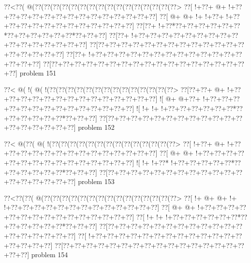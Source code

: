 \vbox{\vbox{\goo
\0??<\0??(\- @(\0??(\0??(\0??(\0??(\0??(\0??(\0??(\0??(\0??(\0??(\0??(\0??(\0??(\0??(\0??(\0??>
\0??[\- !+\0??+\- @+\- !+\0??+\0??+\0??+\0??+\0??+\0??+\0??+\0??+\0??+\0??+\0??+\0??+\0??+\0??]
\0??[\- @+\- @+\- !+\- !+\0??+\- !+\0??+\0??+\0??+\0??+\0??+\0??+\0??+\0??+\0??+\0??+\0??+\0??]
\0??[\0??+\- !+\0??*\0??+\0??+\0??+\0??+\0??+\0??*\0??+\0??+\0??+\0??+\0??+\0??*\0??+\0??+\0??]
\0??[\0??+\- !+\0??+\0??+\0??+\0??+\0??+\0??+\0??+\0??+\0??+\0??+\0??+\0??+\0??+\0??+\0??+\0??]
\0??[\0??+\0??+\0??+\0??+\0??+\0??+\0??+\0??+\0??+\0??+\0??+\0??+\0??+\0??+\0??+\0??+\0??+\0??]
\0??[\0??+\- !+\0??+\0??+\0??+\0??+\0??+\0??+\0??+\0??+\0??+\0??+\0??+\0??+\0??+\0??+\0??+\0??]
\0??[\0??+\0??+\0??+\0??+\0??+\0??+\0??+\0??+\0??+\0??+\0??+\0??+\0??+\0??+\0??+\0??+\0??+\0??]
}
\hfil problem 151\hfil\break
}



\vbox{\vbox{\goo
\0??<\- @(\- !(\- @(\- !(\0??(\0??(\0??(\0??(\0??(\0??(\0??(\0??(\0??(\0??(\0??(\0??(\0??(\0??>
\0??[\0??+\0??+\- @+\- !+\0??+\0??+\0??+\0??+\0??+\0??+\0??+\0??+\0??+\0??+\0??+\0??+\0??+\0??]
\- ![\- @+\- @+\0??+\- !+\0??+\0??+\0??+\0??+\0??+\0??+\0??+\0??+\0??+\0??+\0??+\0??+\0??+\0??]
\- ![\- !+\- !+\- !+\0??+\0??+\0??+\0??+\0??+\0??*\0??+\0??+\0??+\0??+\0??+\0??*\0??+\0??+\0??]
\0??[\0??+\0??+\0??+\0??+\0??+\0??+\0??+\0??+\0??+\0??+\0??+\0??+\0??+\0??+\0??+\0??+\0??+\0??]
}
\hfil problem 152\hfil\break
}



\vbox{\vbox{\goo
\0??<\- @(\0??(\- @(\- !(\0??(\0??(\0??(\0??(\0??(\0??(\0??(\0??(\0??(\0??(\0??(\0??(\0??(\0??>
\0??[\- !+\0??+\- @+\- !+\0??+\0??+\0??+\0??+\0??+\0??+\0??+\0??+\0??+\0??+\0??+\0??+\0??+\0??]
\0??[\- @+\- @+\- !+\0??+\0??+\0??+\0??+\0??+\0??+\0??+\0??+\0??+\0??+\0??+\0??+\0??+\0??+\0??]
\- ![\- !+\- !+\0??*\- !+\0??+\0??+\0??+\0??+\0??*\0??+\0??+\0??+\0??+\0??+\0??*\0??+\0??+\0??]
\0??[\0??+\0??+\0??+\0??+\0??+\0??+\0??+\0??+\0??+\0??+\0??+\0??+\0??+\0??+\0??+\0??+\0??+\0??]
}
\hfil problem 153\hfil\break
}



\vbox{\vbox{\goo
\0??<\0??(\0??(\- @(\0??(\0??(\0??(\0??(\0??(\0??(\0??(\0??(\0??(\0??(\0??(\0??(\0??(\0??(\0??>
\0??[\- !+\- @+\- @+\- !+\- !+\0??+\0??+\0??+\0??+\0??+\0??+\0??+\0??+\0??+\0??+\0??+\0??+\0??]
\0??[\- @+\- @+\- !+\0??+\0??+\0??+\0??+\0??+\0??+\0??+\0??+\0??+\0??+\0??+\0??+\0??+\0??+\0??]
\0??[\- !+\- !+\- !+\0??+\0??+\0??+\0??+\0??+\0??*\0??+\0??+\0??+\0??+\0??+\0??*\0??+\0??+\0??]
\0??[\0??+\0??+\0??+\0??+\0??+\0??+\0??+\0??+\0??+\0??+\0??+\0??+\0??+\0??+\0??+\0??+\0??+\0??]
\0??[\- !+\0??+\0??+\0??+\0??+\0??+\0??+\0??+\0??+\0??+\0??+\0??+\0??+\0??+\0??+\0??+\0??+\0??]
\0??[\0??+\0??+\0??+\0??+\0??+\0??+\0??+\0??+\0??+\0??+\0??+\0??+\0??+\0??+\0??+\0??+\0??+\0??]
}
\hfil problem 154\hfil\break
}




